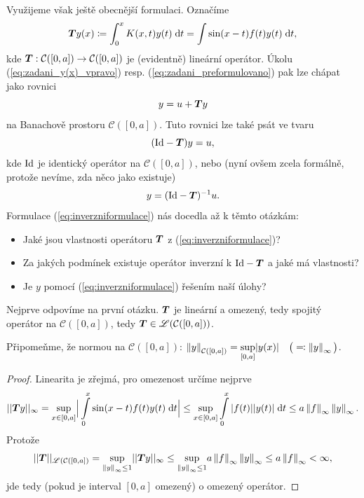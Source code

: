 Využijeme však ještě obecnější formulaci. Označíme
\begin{equation}
     \boldsymbol{T} y(x)\coloneqq \int_0^x K(x,t)y(t)\;\mathrm{d}t=\int\limits\sin(x-t)f(t)y(t)\;\mathrm{d}t,
    \label{eq:obesnejsiformulaceTy}
\end{equation}
kde $ \boldsymbol{T} : \mathcal{C}([0,a])\rightarrow \mathcal{C}([0,a])$ je (evidentně) lineární operátor. Úkolu (\ref{eq:zadani_y(x)_vpravo}) resp. (\ref{eq:zadani_preformulovano}) pak lze chápat jako rovnici
\begin{equation}
    y=u+ \boldsymbol{T} y
\end{equation}
na Banachově prostoru $\mathcal{C}([0,a])$. Tuto rovnici lze také psát ve tvaru
\begin{equation}
    (\mathrm{Id} - \boldsymbol{T} )y=u,
\end{equation}
kde $\mathrm{Id}$ je identický operátor na $\mathcal{C}([0,a])$, nebo (nyní ovšem zcela formálně, protože nevíme, zda něco jako  existuje)
\begin{equation}
    y = (\mathrm{Id} - \boldsymbol{T} )^{-1}u.
    \label{eq:inverzniformulace}
\end{equation}
Formulace (\ref{eq:inverzniformulace}) nás docedla až k těmto otázkám:
\begin{itemize}
    \item Jaké jsou vlastnosti operátoru $ \boldsymbol{T} $ z (\ref{eq:inverzniformulace})?
    \item Za jakých podmínek existuje operátor inverzní k $\mathrm{Id} - \boldsymbol{T} $ a jaké má vlastnosti?
    \item Je $y$  pomocí (\ref{eq:inverzniformulace}) řešením naší úlohy?
\end{itemize}
Nejprve odpovíme na první otázku. $ \boldsymbol{T} $ je lineární a omezený, tedy spojitý operátor na $\mathcal{C}([0,a])$, tedy $ \boldsymbol{T} \in\mathscr{L}(\mathcal{C}([0,a]))$.

Připomeňme, že normou na $\mathcal{C}([0,a])$: $\left\lVert y\right\rVert_{\mathcal{C}([0,a])} = \underset{[0,a]}{\sup} |y(x)| \quad \big(\eqqcolon \left\lVert y\right\rVert_\infty\big)$.

\begin{proof}
Linearita je zřejmá, pro omezenost určíme nejprve
\begin{equation}
    || \boldsymbol{T} y||_\infty = \underset{x\in[0,a]}{\sup}\Big|\int\limits_0^x\sin(x-t)f(t)y(t)\;\mathrm{d}t\Big|\leq \underset{x\in[0,a]}{\sup}\int\limits_0^x|f(t)||y(t)|\;\mathrm{d}t\leq a\left\lVert f\right\rVert_\infty\left\lVert y\right\rVert_\infty.
\end{equation}
Protože  
\begin{equation}
    || \boldsymbol{T} ||_{\mathscr{L}(\mathcal{C}([0,a])} = \underset{\left\lVert y\right\rVert_\infty\leq1}{\sup}|| \boldsymbol{T} y||_\infty\leq \underset{\left\lVert y\right\rVert_\infty\leq1}{\sup} a \left\lVert f\right\rVert_\infty \left\lVert y\right\rVert_\infty\leq a \left\lVert f\right\rVert_\infty<\infty,
    \label{eq:omezeniOperatoru}
\end{equation}
jde tedy (pokud je interval $[0,a]$ omezený) o omezený operátor.
\end{proof}

